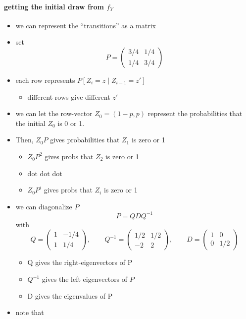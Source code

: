 \paragraph{getting the initial draw from $f_Y$}
\begin{itemize}
\item we can represent the ``transitions'' as a matrix
\item set $$P = \begin{pmatrix} 3/4 & 1/4 \\ 1/4 & 3/4 \end{pmatrix}$$
\item each row represents $P[Z_i = z \mid Z_{i-1} = z']$
\begin{itemize}
\item different rows give different $z'$
\end{itemize}
\item we can let the row-vector $Z_0 = (1-p, p)$ represent the
        probabilities that the initial $Z_0$ is 0 or 1.
\item Then, $Z_0 P$ gives probabilities that $Z_1$ is zero or 1
\begin{itemize}
\item $Z_0 P^2$ gives probs that $Z_2$ is zero or 1
\item dot dot dot
\item $Z_0 P^i$ gives probs that $Z_i$ is zero or 1
\end{itemize}
\item we can diagonalize $P$
        \[P = Q D Q^{-1}\]
        with
        \[Q = \begin{pmatrix} 1 & -1/4 \\ 1 &
        1/4 \end{pmatrix},\qquad 
        Q^{-1} = \begin{pmatrix} 1/2 & 1/2 \\ -2 & 2 \end{pmatrix},
        \qquad 
        D = \begin{pmatrix} 1 & 0 \\ 0 & 1/2 \end{pmatrix}\]
\begin{itemize}
\item Q gives the right-eigenvectors of P
\item $Q^{-1}$ gives the left eigenvectors of $P$
\item D gives the eigenvalues of P
\end{itemize}
\item note that 

\end{itemize}
